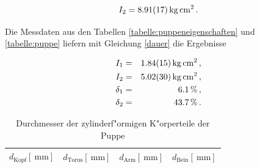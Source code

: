 				\begin{equation*}
					I_2 = \SI{8.91 (17)}{\kilo \gram \centi \meter \squared} \,.
				\end{equation*}

				Die Messdaten aus den Tabellen \ref{tabelle:puppeneigenschaften} und \ref{tabelle:puppe} liefern mit Gleichung \eqref{dauer} die Ergebnisse

				\begin{eqnarray*}
					I_1 & = & \SI{1.84 (15)}{\kilo \gram \centi \meter \squared} \,, \\
					I_2 & = & \SI{5.02 (30)}{\kilo \gram \centi \meter \squared} \,, \\
					\delta_1 & = & \SI{6.1}{\percent} \,, \\
					\delta_2 & = & \SI{43.7}{\percent} \,.
				\end{eqnarray*}

				\clearpage

				\begin{table}[h!]
					\begin{center}
						\caption{Durchmesser der zylinderf"ormigen K"orperteile der Puppe \label{tabelle:puppenradien}}
						\begin{tabular}{|c|c|c|c|}
							\hline
							$d_\mathrm{Kopf} [\SI{}{\milli \meter}]$ & $d_\mathrm{Torus} [\SI{}{\milli \meter}]$ & $d_\mathrm{Arm} [\SI{}{\milli \meter}]$ & $d_\mathrm{Bein} [\SI{}{\milli \meter}]$ \\
							\hline 
							\hline
							
							\hline 
						\end{tabular}
					\end{center}
					
				\end{table}

